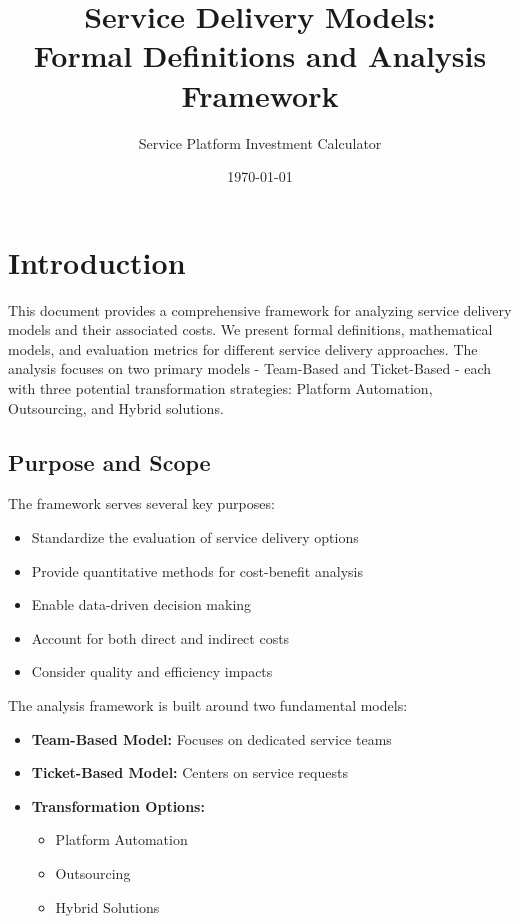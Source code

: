 \documentclass[12pt,a4paper]{article}
\title{\textbf{\LARGE Service Delivery Models:\\[0.3em] Formal Definitions and Analysis Framework}}
\author{\Large Service Platform Investment Calculator}
\date{\today}
\newenvironment{definition}[1]
{\begin{mdframed}[style=definitionstyle,frametitle={Definition: #1}]}
{\end{mdframed}}
\newenvironment{explanation}
{\begin{mdframed}[style=explanationstyle,frametitle={Explanation}]}
{\end{mdframed}}
\begin{document}
\maketitle
\thispagestyle{empty}
\tableofcontents
\clearpage

\section{Introduction}
This document provides a comprehensive framework for analyzing service delivery models and their associated costs. We present formal definitions, mathematical models, and evaluation metrics for different service delivery approaches. The analysis focuses on two primary models - Team-Based and Ticket-Based - each with three potential transformation strategies: Platform Automation, Outsourcing, and Hybrid solutions.

\subsection{Purpose and Scope}
\begin{definition}{Framework Purpose}
The framework serves several key purposes:
\begin{itemize}
    \item Standardize the evaluation of service delivery options
    \item Provide quantitative methods for cost-benefit analysis
    \item Enable data-driven decision making
    \item Account for both direct and indirect costs
    \item Consider quality and efficiency impacts
\end{itemize}
\end{definition}

\begin{explanation}
The analysis framework is built around two fundamental models:
\begin{itemize}
    \item \textbf{Team-Based Model:} Focuses on dedicated service teams
    \item \textbf{Ticket-Based Model:} Centers on service requests
    \item \textbf{Transformation Options:}
    \begin{itemize}
        \item Platform Automation
        \item Outsourcing
        \item Hybrid Solutions
    \end{itemize}
\end{itemize}
\end{explanation}
\end{document}

